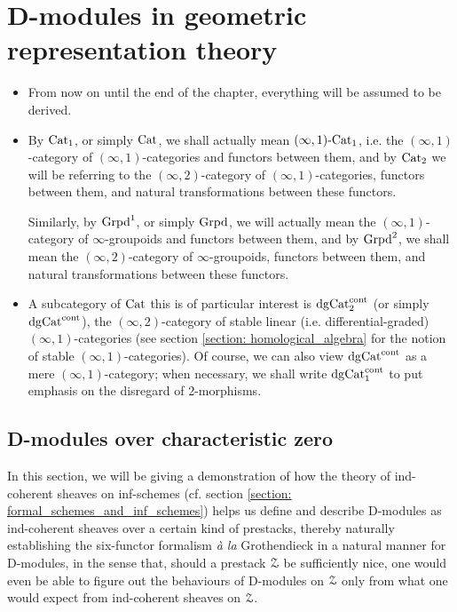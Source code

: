 \chapter{D-modules in geometric representation theory}
    \begin{abstract}
        
    \end{abstract}
    
    \minitoc
    
    \begin{convention} \label{conv: D_modules_everything_is_derived}
        \noindent
        \begin{itemize}
            \item From now on until the end of the chapter, everything will be assumed to be derived. 
            \item By $\mathrm{Cat}_1$, or simply $\mathrm{Cat}$, we shall actually mean $(\infty, 1)\text{-}\mathrm{Cat}_1$, i.e. the $(\infty, 1)$-category of $(\infty, 1)$-categories and functors between them, and by $\mathrm{Cat}_2$ we will be referring to the $(\infty, 2)$-category of $(\infty, 1)$-categories, functors between them, and natural transformations between these functors. 
            
            Similarly, by $\mathrm{Grpd}^1$, or simply $\mathrm{Grpd}$, we will actually mean the $(\infty, 1)$-category of $\infty$-groupoids and functors between them, and by $\mathrm{Grpd}^2$, we shall mean the $(\infty, 2)$-category of $\infty$-groupoids, functors between them, and natural transformations between these functors.
            \item A subcategory of $\mathrm{Cat}$ this is of particular interest is $\mathrm{dg}\mathrm{Cat}^{\mathrm{cont}}_2$ (or simply $\mathrm{dg}\mathrm{Cat}^{\mathrm{cont}}$), the $(\infty, 2)$-category of stable linear (i.e. differential-graded) $(\infty, 1)$-categories (see section \ref{section: homological_algebra} for the notion of stable $(\infty, 1)$-categories). Of course, we can also view $\mathrm{dg}\mathrm{Cat}^{\mathrm{cont}}$ as a mere $(\infty, 1)$-category; when necessary, we shall write $\mathrm{dg}\mathrm{Cat}^{\mathrm{cont}}_1$ to put emphasis on the disregard of $2$-morphisms.
        \end{itemize} 
    \end{convention}
    
    \section{D-modules over characteristic zero}
        In this section, we will be giving a demonstration of how the theory of ind-coherent sheaves on inf-schemes (cf. section \ref{section: formal_schemes_and_inf_schemes}) helps us define and describe D-modules as ind-coherent sheaves over a certain kind of prestacks, thereby naturally establishing the six-functor formalism \textit{\`a la} Grothendieck in a natural manner for D-modules, in the sense that, should a prestack $\mathcal{Z}$ be sufficiently nice, one would even be able to figure out the behaviours of D-modules on $\mathcal{Z}$ only from what one would expect from ind-coherent sheaves on $\mathcal{Z}$. 
        

